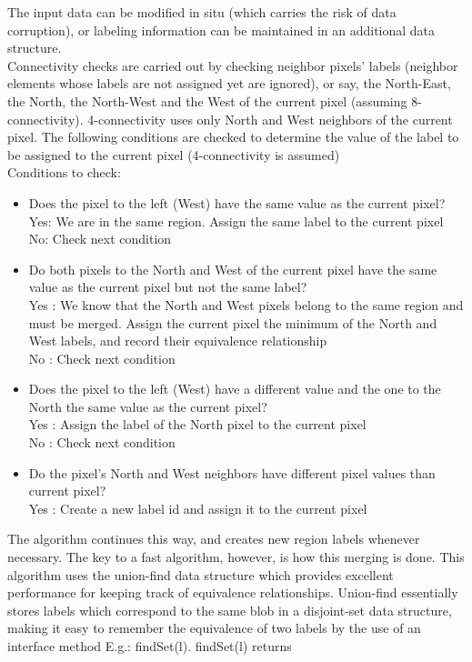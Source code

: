 \documentclass[paper=a4, fontsize=11pt]{scrartcl} %
\numberwithin{equation}{section} %
\numberwithin{figure}{section} %
\numberwithin{table}{section} %
\begin{document}
The input data can be modified in situ (which carries the risk of data corruption), or labeling information can be maintained in an additional data structure.\\

Connectivity checks are carried out by checking neighbor pixels' labels (neighbor elements whose labels are not assigned yet are ignored), or say, the North-East, the North, the North-West and the West of the current pixel (assuming 8-connectivity). 4-connectivity uses only North and West neighbors of the current pixel. The following conditions are checked to determine the value of the label to be assigned to the current pixel (4-connectivity is assumed)\\

Conditions to check:\\
\begin{itemize}

\item Does the pixel to the left (West) have the same value as the current pixel?\\
Yes: We are in the same region. Assign the same label to the current pixel\\
No:  Check next condition

\item Do both pixels to the North and West of the current pixel have the same value as the current pixel but not the same label?\\
Yes :  We know that the North and West pixels belong to the same region and must be merged. Assign the current pixel the minimum of the North and West labels, and record their equivalence relationship\\
No :  Check next condition

\item Does the pixel to the left (West) have a different value and the one to the North the same value as the current pixel?\\
Yes :  Assign the label of the North pixel to the current pixel\\
No :  Check next condition

\item Do the pixel's North and West neighbors have different pixel values than current pixel?\\
Yes :  Create a new label id and assign it to the current pixel\\

\end{itemize}
The algorithm continues this way, and creates new region labels whenever necessary. The key to a fast algorithm, however, is how this merging is done. This algorithm uses the union-find data structure which provides excellent performance for keeping track of equivalence relationships. Union-find essentially stores labels which correspond to the same blob in a disjoint-set data structure, making it easy to remember the equivalence of two labels by the use of an interface method E.g.: findSet(l). findSet(l) returns 
\end{document}
